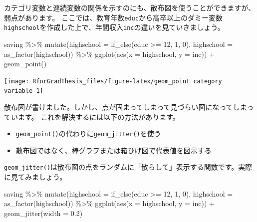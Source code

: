 \documentclass[
]{book}
\newenvironment{Shaded}{\begin{snugshade}}{\end{snugshade}}
\newcommand{\AttributeTok}[1]{\textcolor[rgb]{0.77,0.63,0.00}{#1}}
\newcommand{\DecValTok}[1]{\textcolor[rgb]{0.00,0.00,0.81}{#1}}
\newcommand{\FloatTok}[1]{\textcolor[rgb]{0.00,0.00,0.81}{#1}}
\newcommand{\FunctionTok}[1]{\textcolor[rgb]{0.00,0.00,0.00}{#1}}
\newcommand{\NormalTok}[1]{#1}
\newcommand{\SpecialCharTok}[1]{\textcolor[rgb]{0.00,0.00,0.00}{#1}}
\providecommand{\tightlist}{%
  \setlength{\itemsep}{0pt}\setlength{\parskip}{0pt}}
\begin{document}
カテゴリ変数と連続変数の関係を示すのにも、散布図を使うことができますが、弱点があります。
ここでは、教育年数\texttt{educ}から高卒以上のダミー変数\texttt{highschool}を作成した上で、年間収入\texttt{inc}の違いを見ていきましょう。

\begin{Shaded}
\begin{Highlighting}[]
\NormalTok{saving }\SpecialCharTok{\%\textgreater{}\%}
  \FunctionTok{mutate}\NormalTok{(}\AttributeTok{highschool =} \FunctionTok{if\_else}\NormalTok{(educ }\SpecialCharTok{\textgreater{}=} \DecValTok{12}\NormalTok{, }\DecValTok{1}\NormalTok{, }\DecValTok{0}\NormalTok{),}
         \AttributeTok{highschool =} \FunctionTok{as\_factor}\NormalTok{(highschool)) }\SpecialCharTok{\%\textgreater{}\%}
  \FunctionTok{ggplot}\NormalTok{(}\FunctionTok{aes}\NormalTok{(}\AttributeTok{x =}\NormalTok{ highschool, }\AttributeTok{y =}\NormalTok{ inc)) }\SpecialCharTok{+}
  \FunctionTok{geom\_point}\NormalTok{()}
\end{Highlighting}
\end{Shaded}

\begin{center}\texttt{[image: RforGradThesis\_files/figure-latex/geom\_point category variable-1]} \end{center}

散布図が書けました。しかし、点が固まってしまって見づらい図になってしまっています。
これを解決するには以下の方法があります。

\begin{itemize}
\tightlist
\item
  \texttt{geom\_point()}の代わりに\texttt{geom\_jitter()}を使う
\item
  散布図ではなく、棒グラフまたは箱ひげ図で代表値を図示する
\end{itemize}

\texttt{geom\_jitter()}は散布図の点をランダムに「散らして」表示する関数です。実際に見てみましょう。

\begin{Shaded}
\begin{Highlighting}[]
\NormalTok{saving }\SpecialCharTok{\%\textgreater{}\%}
  \FunctionTok{mutate}\NormalTok{(}\AttributeTok{highschool =} \FunctionTok{if\_else}\NormalTok{(educ }\SpecialCharTok{\textgreater{}=} \DecValTok{12}\NormalTok{, }\DecValTok{1}\NormalTok{, }\DecValTok{0}\NormalTok{),}
         \AttributeTok{highschool =} \FunctionTok{as\_factor}\NormalTok{(highschool)) }\SpecialCharTok{\%\textgreater{}\%}
  \FunctionTok{ggplot}\NormalTok{(}\FunctionTok{aes}\NormalTok{(}\AttributeTok{x =}\NormalTok{ highschool, }\AttributeTok{y =}\NormalTok{ inc)) }\SpecialCharTok{+}
  \FunctionTok{geom\_jitter}\NormalTok{(}\AttributeTok{width =} \FloatTok{0.2}\NormalTok{)}
\end{Highlighting}
\end{Shaded}
\end{document}
